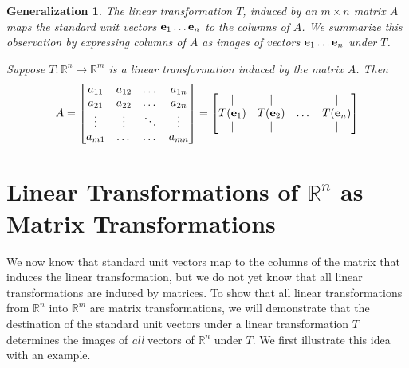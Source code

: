 \documentclass{ximera}
\renewcommand{\vec}[1]{{\bf #1}}
\newcommand{\RR}{\mathbb{R}}
\newtheorem{general}{Generalization}
\begin{document}
\begin{general} The linear transformation $T$, induced by an $m\times n$ matrix $A$ maps the standard unit vectors $\vec{e}_1\ldots \vec{e}_n$ to the columns of $A$.  We summarize this observation by expressing columns of $A$ as images of vectors $\vec{e}_1\ldots \vec{e}_n$ under $T$.

  Suppose $T:\RR^n\rightarrow\RR^m$ is a linear transformation induced by the matrix $A$.  Then
\begin{equation*} \label{eq:matlintrans}
 A=\begin{bmatrix}
           a_{11} & a_{12}&\dots&a_{1n}\\
           a_{21}&a_{22} &\dots &a_{2n}\\
		\vdots & \vdots&\ddots &\vdots\\
		a_{m1}&\dots &\dots &a_{mn}
         \end{bmatrix}
		 = 
         \begin{bmatrix}
           | & |& &|\\
		T(\vec{e}_1) & T(\vec{e}_2)&\dots &T(\vec{e}_n)\\
		|&| & &|
         \end{bmatrix}
\end{equation*}
\end{general}

\section*{Linear Transformations of $\RR^n$ as Matrix Transformations}

We now know that standard unit vectors map to the columns of the matrix that induces the linear transformation, but we do not yet know that all linear transformations are induced by matrices.  To show that all linear transformations from $\RR^n$ into $\RR^m$ are matrix transformations, we will demonstrate that the destination of the standard unit vectors under a linear transformation $T$ determines the images of {\it all} vectors of $\RR^n$ under $T$. We first illustrate this idea with an example.  
\end{document}
